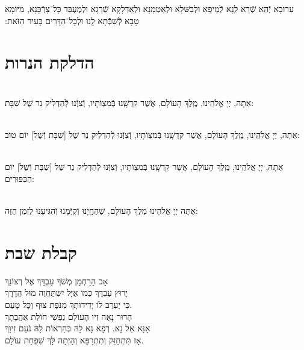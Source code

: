 \documentclass[twoside, openany, parskip=half, 11pt]{book}
\begin{document}
 עֵרוּבָא יְֿהֵא שְֿׁרֵא לַֽנָא לְֿמֵיפֵא וּלְבַשּּׁלָא וּלְאַטְמָנָא וּלְאַדְלָקָא שְֿׁרָגָא וּלְמֶעְבַּד כָּל־צָרְֿכָּנָא, מִיּוֹמָא טָבָא לְֿשַׁבְּֿֿתָא לָֽנוּ וּלְכׇל־הַדָּרִים בָּעִיר הַזּׂאת:‏


\vspace{\baselineskip}
{\let\clearpage\relax
\chapter[הדלקת הנרות שבת ויום טוב]{ הדלקת הנרות }}

\\
 אַתָה, יְיָ אֱלֹהֵֽינוּ, מֶֽלֶךְ הָעוֹלָם, אֲשֶׁר קִדְשָֽׁנוּ בְּֿמִצְוֹתָיו, וְֿצִוְּֽֿנוּ לְֿהַדְלִיק נֵר שֶׁל שַׁבָּת:

\\
 אַתָה, יְיָ אֱלֹהֵֽינוּ, מֶֽלֶךְ הָעוֹלָם, אֲשֶׁר קִדְשָֽׁנוּ בְּֿמִצְוֹתָיו, וְֿצִוְּֽֿנוּ לְֿהַדְלִיק נֵר שֶׁל
[שַׁבָּת וְֿשֶׁל] יוֹם טוֹב:

\\
 אַתָה, יְיָ אֱלֹהֵֽינוּ, מֶֽלֶךְ הָעוֹלָם, אֲשֶׁר קִדְשָֽׁנוּ בְּֿמִצְוֹתָיו, וְֿצִוְּֽֿנוּ לְֿהַדְלִיק נֵר שֶׁל
[שַׁבָּת וְֿשֶׁל] יוֹם הַכִּפּוּרִים:

\\
 אַתָּה יְיָ אֱלֹהֵינוּ מֶלֶךְ הָעוֹלָם, שֶׁהֶחֱיָנוּ וְֿקִיְּֿֿמָנוּ וְֿהִגִּיעָנוּ לַזְמַן הַזֶּה:



\chapter[קבלת שבת]{ קבלת שבת }
\label{kabalas_shabbos}

	אָב הָרַחְמָן מְשֹׁךְ עַבְדָּךְ אֶל רְצוֹנָךְ\\
	יָרוּץ עַבְדָּךְ כְּמוֹ אַיָּל	יִשְׁתַּחֲוֶה מוּל הֲדָרָךְ\\
	כִּי יֶעְרַב לוֹ יְדִידוּתָךְ מִנֹּפֶת צוּף וְכָל טָעַם.\\
	
	
	הָדוּר נָאֶה זִיו הָעוֹלָם נַפְשִׁי חוֹלַת אַהֲבָתָךְ\\
	אָנָּא אֵל נָא, רְפָא נָא לָהּ בְּהַרְאוֹת לָהּ נֹעַם זִיוָךְ\\
	אָז תִּתְחַזֵּק וְתִתְרַפֵּא וְהָיְתָה לָּךְ שִׁפְחַת עוֹלָם.\\
	
\end{document}
